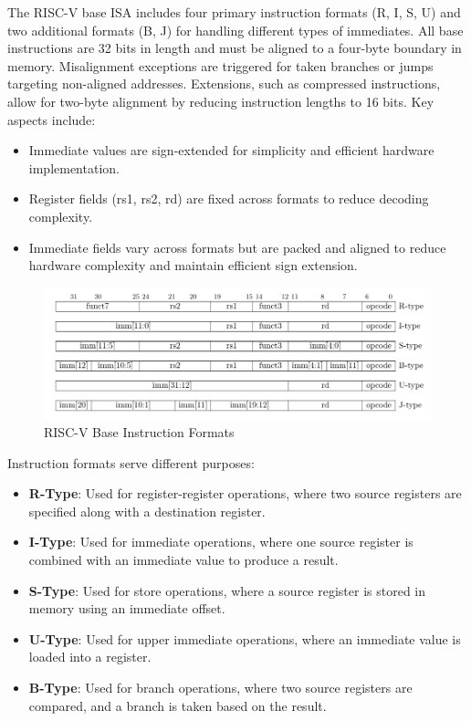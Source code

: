 \documentclass[12pt]{report}
\begin{document}
The RISC-V base ISA includes four primary instruction formats (R, I, S, U) and two additional formats (B, J) for handling different types of immediates. All base instructions are 32 bits in length and must be aligned to a four-byte boundary in memory. Misalignment exceptions are triggered for taken branches or jumps targeting non-aligned addresses. Extensions, such as compressed instructions, allow for two-byte alignment by reducing instruction lengths to 16 bits. Key aspects include:
\begin{itemize}
    \item Immediate values are sign-extended for simplicity and efficient hardware implementation.
    \item Register fields (rs1, rs2, rd) are fixed across formats to reduce decoding complexity.
    \item Immediate fields vary across formats but are packed and aligned to reduce hardware complexity and maintain efficient sign extension.
\end{itemize}

\begin{figure}[H]
    \centering
    \includegraphics[width=1\textwidth]{./figures/riscv-base-isa.png}
    \caption{RISC-V Base Instruction Formats}
\end{figure}

Instruction formats serve different purposes:

\begin{itemize}
    \item \textbf{R-Type}: Used for register-register operations, where two source registers are specified along with a destination register.
    \item \textbf{I-Type}: Used for immediate operations, where one source register is combined with an immediate value to produce a result.
    \item \textbf{S-Type}: Used for store operations, where a source register is stored in memory using an immediate offset.
    \item \textbf{U-Type}: Used for upper immediate operations, where an immediate value is loaded into a register.
    \item \textbf{B-Type}: Used for branch operations, where two source registers are compared, and a branch is taken based on the result.
\end{itemize}
\end{document}
